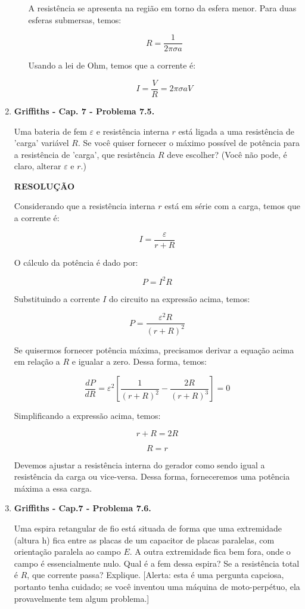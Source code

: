 \documentclass[11pt,a4paper]{article}
\begin{document}
\begin{enumerate}
\begin{enumerate}
A resistência se apresenta na região em torno da esfera menor. Para duas esferas submersas, temos:

$$R = \displaystyle\dfrac{1}{2\pi \sigma a}$$

Usando a lei de Ohm, temos que a corrente é:

$$I = \displaystyle\dfrac{V}{R} = 2\pi \sigma a V$$

\end{enumerate}


\item \textbf{Griffiths - Cap. 7 - Problema 7.5.}


Uma bateria de fem $\varepsilon$ e resistência interna $r$ está ligada a uma resistência de 'carga' variável $R$. Se você quiser fornecer o máximo possível de potência para a resistência de 'carga', que resistência $R$ deve escolher? (Você não pode, é claro, alterar $\varepsilon$ e $r$.)

\textbf{RESOLUÇÃO}

Considerando que a resistência interna $r$ está em série com a carga, temos que a corrente é:

$$I = \displaystyle\dfrac{\varepsilon}{r + R}$$

O cálculo da potência é dado por:

$$P = I^2R$$

Substituindo a corrente $I$ do circuito na expressão acima, temos:

$$P = \displaystyle\dfrac{\varepsilon^2R}{(r + R)^2}$$

Se quisermos fornecer potência máxima, precisamos derivar a equação acima em relação a $R$ e igualar a zero. Dessa forma, temos:

$$\displaystyle\dfrac{dP}{dR} = \varepsilon^2\left[\displaystyle\dfrac{1}{(r + R)^2} - \displaystyle\dfrac{2R}{(r + R)^3}\right] = 0$$

Simplificando a expressão acima, temos:

$$r + R = 2R$$

$$R = r$$

Devemos ajustar a resistência interna do gerador como sendo igual a resistência da carga ou vice-versa. Dessa forma, forneceremos uma potência máxima a essa carga.

\item \textbf{Griffiths - Cap.7 - Problema 7.6.}

Uma espira retangular de fio está situada de forma que uma extremidade (altura h) fica entre as placas de um capacitor de placas paralelas, com orientação paralela ao campo $E$. A outra extremidade fica bem fora, onde o campo é essencialmente nulo. Qual é a fem dessa espira? Se a resistência total é $R$, que corrente passa? Explique. [Alerta: esta é uma pergunta capciosa, portanto tenha cuidado; se você inventou uma máquina de moto-perpétuo, ela provavelmente tem algum problema.]


\end{enumerate}
\end{document}
